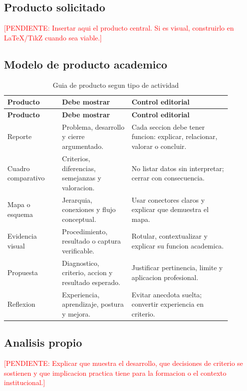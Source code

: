 \documentclass[
	spanish,
	letterpaper, oneside
]{article}
\newcommand{\pendiente}[1]{\textcolor{red}{[PENDIENTE: #1]}}
\begin{document}
\subsection{Producto solicitado}

\pendiente{Insertar aqui el producto central. Si es visual, construirlo en LaTeX/TikZ cuando sea viable.}

\subsection{Modelo de producto academico}

\begin{longtable}{@{}p{0.22\linewidth}p{0.28\linewidth}p{0.40\linewidth}@{}}
	\caption{Guia de producto segun tipo de actividad}\label{tab:producto-academico-itesca}\\
	\toprule
	\textbf{Producto} & \textbf{Debe mostrar} & \textbf{Control editorial} \\
	\midrule
	\endfirsthead
	\toprule
	\textbf{Producto} & \textbf{Debe mostrar} & \textbf{Control editorial} \\
	\midrule
	\endhead
	Reporte & Problema, desarrollo y cierre argumentado. & Cada seccion debe tener funcion: explicar, relacionar, valorar o concluir. \\
	Cuadro comparativo & Criterios, diferencias, semejanzas y valoracion. & No listar datos sin interpretar; cerrar con consecuencia. \\
	Mapa o esquema & Jerarquia, conexiones y flujo conceptual. & Usar conectores claros y explicar que demuestra el mapa. \\
	Evidencia visual & Procedimiento, resultado o captura verificable. & Rotular, contextualizar y explicar su funcion academica. \\
	Propuesta & Diagnostico, criterio, accion y resultado esperado. & Justificar pertinencia, limite y aplicacion profesional. \\
	Reflexion & Experiencia, aprendizaje, postura y mejora. & Evitar anecdota suelta; convertir experiencia en criterio. \\
	\bottomrule
\end{longtable}

\subsection{Analisis propio}

\pendiente{Explicar que muestra el desarrollo, que decisiones de criterio se sostienen y que implicacion practica tiene para la formacion o el contexto institucional.}
\end{document}
